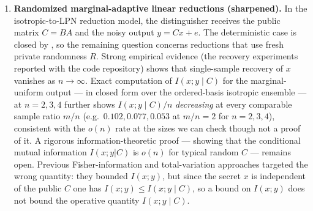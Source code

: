\documentclass[11pt,a4paper]{article}
\theoremstyle{plain}
\theoremstyle{definition}
\begin{document}
\begin{enumerate}
it is open (\emph{evidence}: the $n=2$ enumeration and the elementary $W(g)=\Theta(n)$; \emph{conjecture}: that no usable intermediate~$H$ or correction exists).

\item \textbf{Randomized marginal-adaptive linear reductions (sharpened).} \label{open:marginal-adaptive} In the isotropic-to-LPN reduction model, the distinguisher receives the public matrix $C=BA$ and the noisy output $y=Cx+e$. The deterministic case is closed by , so the remaining question concerns reductions that use fresh private randomness $R$. Strong empirical evidence (the recovery experiments reported with the code repository) shows that single-sample recovery of $x$ vanishes as $n\to\infty$.  Exact computation of $I(x;y\mid C)$ for the marginal-uniform output --- in closed form over the ordered-basis isotropic ensemble --- at $n=2,3,4$ further shows $I(x;y\mid C)/n$ \emph{decreasing} at every comparable sample ratio $m/n$ (e.g.\ $0.102, 0.077, 0.053$ at $m/n=2$ for $n=2,3,4$), consistent with the $o(n)$ rate at the sizes we can check though not a proof of it.  A rigorous information-theoretic proof --- showing that the conditional mutual information $I(x;y|C)$ is $o(n)$ for typical random $C$ --- remains open.  Previous Fisher-information and total-variation approaches targeted the wrong quantity: they bounded $I(x;y)$, but since the secret $x$ is independent of the public $C$ one has $I(x;y) \le I(x;y\mid C)$, so a bound on $I(x;y)$ does not bound the operative quantity $I(x;y\mid C)$.


\end{enumerate}
\end{document}
